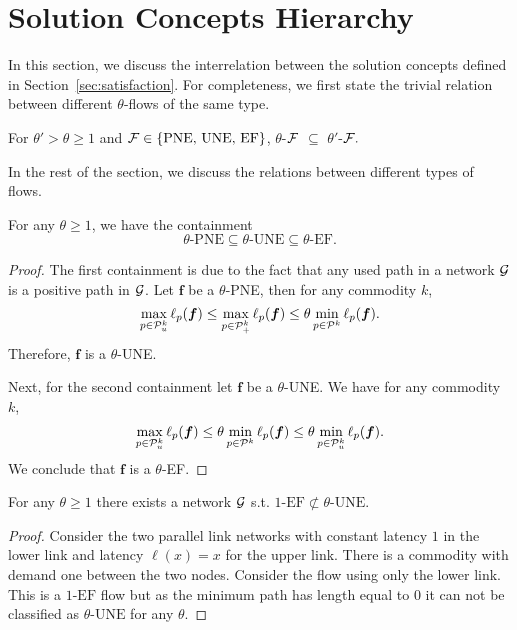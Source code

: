 \section{Solution Concepts Hierarchy}\label{sec:hier}
In this section, we discuss the interrelation between the solution concepts defined in Section~\ref{sec:satisfaction}. 
For completeness, we first state the trivial relation between different $\theta$-flows of the same type.
\begin{proposition}\label{lemm:intra}
For $\theta' > \theta\geq 1$ and $\mathcal{F} \in \{\text{PNE, UNE, EF}\}$, $\theta$-$\mathcal{F}$ $\subseteq$ $\theta'$-$\mathcal{F}.$
\end{proposition}

In the rest of the section, we discuss the relations between different types of flows. 
\begin{lemma}\label{lemm:PNEvUNEvEF}
For any $\theta\geq 1$, we have the containment 
$$\theta\text{-PNE} \subseteq \theta\text{-UNE} \subseteq \theta\text{-EF}.$$
\end{lemma}
\begin{proof}
The first containment is due to the fact that any used path in a network $\mathcal{G}$ is a positive path in $\mathcal{G}$. Let $\bm{f}$ be a $\theta$-PNE, then for any commodity $k$, $$\max_{p\in \mathcal{P}^k_u} \ell_p(\bm{f}) \leq \max_{p\in \mathcal{P}^k_{+}} \ell_p(\bm{f}) \leq \theta\min_{p\in \mathcal{P}^k} \ell_p(\bm{f}).$$ Therefore, $\bm{f}$ is a $\theta$-UNE. 

Next, for the second containment let $\bm{f}$ be a $\theta$-UNE. We have for any commodity $k$, $$\max_{p\in \mathcal{P}^k_u} \ell_p(\bm{f}) \leq \theta\min_{p\in \mathcal{P}^k} \ell_p(\bm{f}) \leq \theta\min_{p\in \mathcal{P}^k_{u}} \ell_p(\bm{f}).$$ We conclude that $\bm{f}$ is a $\theta$-EF.
\end{proof}

\begin{proposition}\label{lemm:EFvUNE}
For any $\theta \geq 1$ there exists a network $\mathcal{G}$ s.t. $1\text{-EF} \not\subset \theta\text{-UNE}.$
\end{proposition}
\begin{proof}
Consider the two parallel link networks with constant latency $1$ in the lower link and latency $\ell(x)=x$ for the upper link. There is a commodity with demand one between the two nodes. Consider the flow using only the lower link. This is a $1\text{-EF}$ flow but as the minimum path has length equal to $0$ it can not be classified as $\theta\text{-UNE}$ for any $\theta$.
\end{proof}

